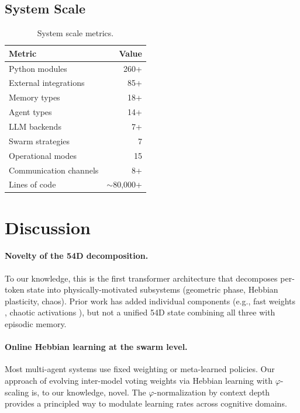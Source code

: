 \documentclass[11pt,a4paper]{article}
\begin{document}
\subsection{System Scale}

\begin{table}[h]
\centering
\caption{System scale metrics.}
\label{tab:scale}
\begin{tabular}{lr}
\toprule
\textbf{Metric} & \textbf{Value} \\
\midrule
Python modules & 260+ \\
External integrations & 85+ \\
Memory types & 18+ \\
Agent types & 14+ \\
LLM backends & 7+ \\
Swarm strategies & 7 \\
Operational modes & 15 \\
Communication channels & 8+ \\
Lines of code & $\sim$80{,}000+ \\
\bottomrule
\end{tabular}
\end{table}

\section{Discussion}
\label{sec:discussion}

\paragraph{Novelty of the 54D decomposition.}
To our knowledge, this is the first transformer architecture that decomposes per-token state into physically-motivated subsystems (geometric phase, Hebbian plasticity, chaos). Prior work has added individual components (e.g., fast weights \citep{schlag2021linear}, chaotic activations \citep{jaeger2004harnessing}), but not a unified 54D state combining all three with episodic memory.

\paragraph{Online Hebbian learning at the swarm level.}
Most multi-agent systems use fixed weighting or meta-learned policies. Our approach of evolving inter-model voting weights via Hebbian learning with $\varphi$-scaling is, to our knowledge, novel. The $\varphi$-normalization by context depth provides a principled way to modulate learning rates across cognitive domains.
\end{document}
